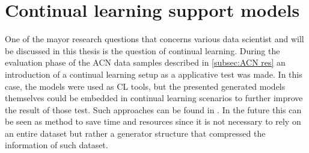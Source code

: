 \section{Continual learning support models}
\label{sec:apply cl}
One of the mayor research questions that concerns various data scientist and will be discussed in this thesis is the question of continual learning. During the evaluation phase of the ACN data samples described in \ref{subsec:ACN res}  an introduction of a continual learning setup as a applicative test was made. In this case, the models were used as CL tools, but the presented generated models themselves could be  embedded in continual learning scenarios to further improve the result of those test. Such approaches can be found in \cite{shin2017continual}. In the future this can be seen as method to save time and resources since it is not necessary to rely on an entire dataset but rather a generator structure that compressed the information of such dataset.